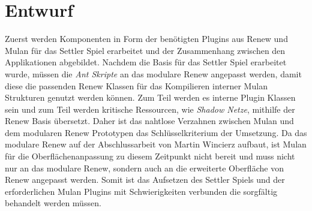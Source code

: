 \section{Entwurf}
	Zuerst werden Komponenten in Form der benötigten Plugins aus Renew und Mulan für das Settler Spiel erarbeitet und der Zusammenhang zwischen den Applikationen abgebildet.\bigbreak
	Nachdem die Basis für das Settler Spiel erarbeitet wurde, müssen die \textit{Ant Skripte} an das modulare Renew angepasst werden, damit diese die passenden Renew Klassen für das Kompilieren interner Mulan Strukturen genutzt werden können. Zum Teil werden es interne Plugin Klassen sein und zum Teil werden kritische Ressourcen, wie \textit{Shadow Netze}, mithilfe der Renew Basis übersetzt. Daher ist das nahtlose Verzahnen zwischen Mulan und dem modularen Renew Prototypen das Schlüsselkriterium der Umsetzung. \bigbreak
	Da das modulare Renew auf der Abschlussarbeit von Martin Wincierz \cite{martinWinc} aufbaut, ist Mulan für die Oberflächenanpassung zu diesem Zeitpunkt nicht bereit und muss nicht nur an das modulare Renew, sondern auch an die erweiterte Oberfläche von Renew angepasst werden.\newline
	Somit ist das Aufsetzen des Settler Spiels und der erforderlichen Mulan Plugins mit Schwierigkeiten verbunden die sorgfältig behandelt werden müssen. 

